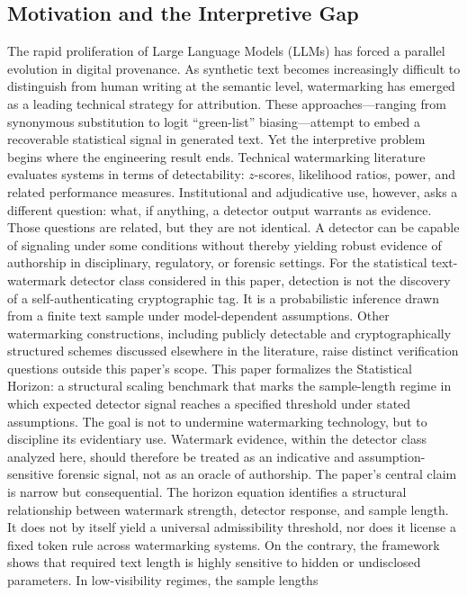 \documentclass[11pt]{article}
\begin{document}
\subsection{Motivation and the Interpretive Gap}
The rapid proliferation of Large Language Models (LLMs) has forced a parallel
evolution in digital provenance. As synthetic text becomes increasingly difficult
to distinguish from human writing at the semantic level, watermarking has emerged
as a leading technical strategy for attribution. These approaches---ranging from
synonymous substitution to logit ``green-list'' biasing---attempt to embed a
recoverable statistical signal in generated text.
Yet the interpretive problem begins where the engineering result ends. Technical
watermarking literature evaluates systems in terms of detectability: $z$-scores,
likelihood ratios, power, and related performance measures. Institutional and
adjudicative use, however, asks a different question: what, if anything, a
detector output warrants as evidence. Those questions are related, but they are
not identical. A detector can be capable of signaling under some conditions
without thereby yielding robust evidence of authorship in disciplinary,
regulatory, or forensic settings.
For the statistical text-watermark detector class considered in this paper,
detection is not the discovery of a self-authenticating cryptographic tag. It is
a probabilistic inference drawn from a finite text sample under model-dependent
assumptions. Other watermarking constructions, including publicly detectable and
cryptographically structured schemes discussed elsewhere in the literature, raise
distinct verification questions outside this paper's scope. This paper formalizes
the Statistical Horizon: a structural scaling benchmark that marks the
sample-length regime in which expected detector signal reaches a specified
threshold under stated assumptions. The goal is not to undermine watermarking
technology, but to discipline its evidentiary use. Watermark evidence, within the
detector class analyzed here, should therefore be treated as an indicative and
assumption-sensitive forensic signal, not as an oracle of authorship.
The paper's central claim is narrow but consequential. The horizon equation
identifies a structural relationship between watermark strength, detector
response, and sample length. It does not by itself yield a universal admissibility
threshold, nor does it license a fixed token rule across watermarking systems. On
the contrary, the framework shows that required text length is highly sensitive to
hidden or undisclosed parameters. In low-visibility regimes, the sample lengths
\end{document}
